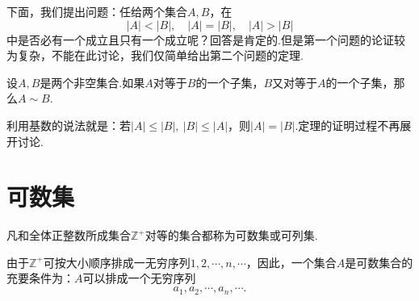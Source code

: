 下面，我们提出问题：任给两个集合$A,B$，在
$$|A|<|B|,\quad |A|=|B|,\quad |A|>|B|$$
中是否必有一个成立且只有一个成立呢？回答是肯定的.但是第一个问题的论证较为复杂，不能在此讨论，我们仅简单给出第二个问题的定理.
\begin{theorem}[Bernstein定理]
	设$A,B$是两个非空集合.如果$A$对等于$B$的一个子集，$B$又对等于$A$的一个子集，那么$A\sim B$.
\end{theorem}
利用基数的说法就是：若$|A|\leqslant|B|,\ |B|\leqslant |A|$，则$|A|=|B|$.定理的证明过程不再展开讨论.
\section{可数集}
\begin{definition}[可数集]
	凡和全体正整数所成集合$\mathbb{Z}^+$对等的集合都称为{\heiti 可数集}或{\heiti 可列集}.
\end{definition}
由于$\mathbb{Z}^+$可按大小顺序排成一无穷序列$1,2,\cdots,n,\cdots$，因此，一个集合$A$是可数集合的充要条件为：$A$可以排成一个无穷序列
$$a_1,a_2,\cdots,a_n,\cdots .$$

